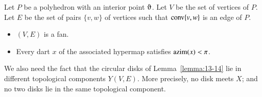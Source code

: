 \begin{lemma}\label{lemma:polyhedron}%
Let $P$ be a polyhedron with an interior point $\orgn$.
Let $V$ be the set of vertices of $P$.  Let $E$ be the set of pairs $\{v,w\}$ of vertices such that ${\operatorname{conv}}\{v,w\}$ is an edge of $P$.
\begin{itemize}
\item $(V,E)$ is a fan.
\item Every dart $x$ of the associated hypermap satisfies ${\operatorname{azim}}(x)<\pi$.
\end{itemize}
\end{lemma}


\begin{note}%
We also need the fact that the circular disks of Lemma~\ref{lemma:13-14} lie in different topological components $Y(V,E)$.  More precisely, no disk meets $X$; and no two disks lie in the same topological component.
\end{note}


